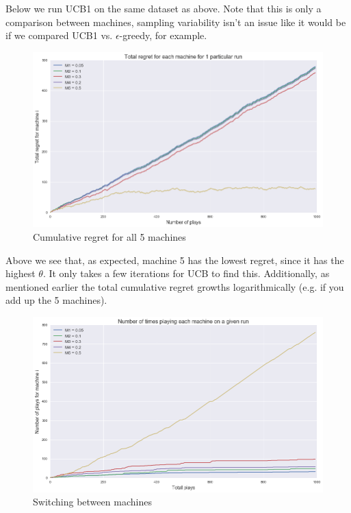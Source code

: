 \documentclass{article}
\begin{document}
Below we run UCB1 on the same dataset as above. Note that this is only a comparison between machines, sampling variability isn't an issue like it would be if we compared UCB1 vs. $\epsilon$-greedy, for example.

\begin{figure}[H]
\centering
\includegraphics[scale=0.4]{UCB_regret.png}
\caption{Cumulative regret for all 5 machines}
\end{figure}

Above we see that, as expected, machine 5 has the lowest regret, since it has the highest $\theta$. It only takes a few iterations for UCB to find this. Additionally, as mentioned earlier the total cumulative regret growths logarithmically (e.g. if you add up the 5 machines). 

\begin{figure}[H]
\centering
\includegraphics[scale=0.4]{UCB_num_plays.png}
\caption{Switching between machines}
\end{figure}
\end{document}
